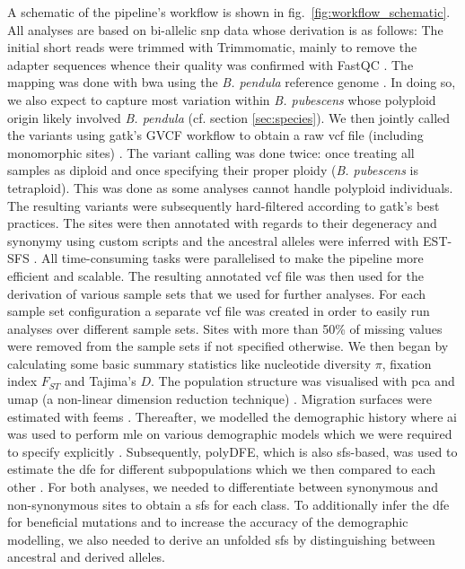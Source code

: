 \documentclass[hidelinks,11pt]{article}
\newcommand{\dadi}{\textdelta a\textdelta i}
\newcommand{\pendula}{\textit{B. pendula}}
\newcommand{\pubescens}{\textit{B. pubescens}}
\begin{document}
{    A schematic of the pipeline's workflow is shown in fig.~\ref{fig:workflow_schematic}. All analyses are based on bi-allelic \acrshort{snp} data whose derivation is as follows: The initial short reads were trimmed with Trimmomatic, mainly to remove the adapter sequences whence their quality was confirmed with FastQC \cite{trimmomatic,fastqc}. The mapping was done with \acrshort{bwa} using the \pendula{} reference genome \cite{ref-genome}. In doing so, we also expect to capture most variation within \pubescens{} whose polyploid origin likely involved \pendula{} (cf. section \ref{sec:species}). We then jointly called the variants using \acrshort{gatk}'s GVCF workflow to obtain a raw \acrshort{vcf} file (including monomorphic sites) \cite{gatk}. The variant calling was done twice: once treating all samples as diploid and once specifying their proper ploidy (\pubescens{} is tetraploid). This was done as some analyses cannot handle polyploid individuals. The resulting variants were subsequently hard-filtered according to \acrshort{gatk}'s best practices. The sites were then annotated with regards to their degeneracy and synonymy using custom scripts and the ancestral alleles were inferred with EST-SFS \cite{est-sfs}. All time-consuming tasks were parallelised to make the pipeline more efficient and scalable. The resulting annotated \acrshort{vcf} file was then used for the derivation of various sample sets that we used for further analyses. For each sample set configuration a separate \acrshort{vcf} file was created in order to easily run analyses over different sample sets. Sites with more than 50\% of missing values were removed from the sample sets if not specified otherwise. We then began by calculating some basic summary statistics like nucleotide diversity $\pi$, fixation index $F_{ST}$ and Tajima's $D$. The population structure was visualised with \acrshort{pca} and \acrshort{umap} (a non-linear dimension reduction technique) \cite{umap}. Migration surfaces were estimated with \acrshort{feems} \cite{feems}. Thereafter, we modelled the demographic history where \dadi{} was used to perform \acrfull{mle} on various demographic models which we were required to specify explicitly \cite{dadi}. Subsequently, polyDFE, which is also \acrshort{sfs}-based, was used to estimate the \acrfull{dfe} for different subpopulations which we then compared to each other \cite{polydfe}. For both analyses, we needed to differentiate between synonymous and non-synonymous sites to obtain a \acrfull{sfs} for each class. To additionally infer the \acrshort{dfe} for beneficial mutations and to increase the accuracy of the demographic modelling, we also needed to derive an unfolded \acrshort{sfs} by distinguishing between ancestral and derived alleles.

}
\end{document}
